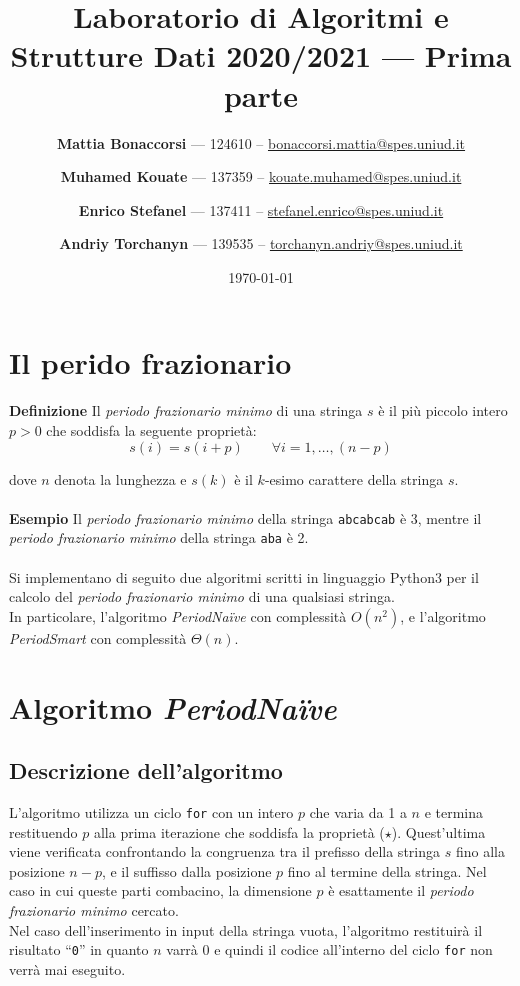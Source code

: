 \documentclass[11pt,a4paper,italian]{article}
\title{\textbf{Laboratorio di Algoritmi e Strutture Dati 2020/2021} --- Prima parte}
\date{\today}
\author{\textbf{Mattia Bonaccorsi} --- 124610 -- \href{mailto:bonaccorsi.mattia@spes.uniud.it}{bonaccorsi.mattia@spes.uniud.it}
   \and \textbf{Muhamed Kouate} --- 137359 -- \href{mailto:kouate.muhamed@spes.uniud.it}{kouate.muhamed@spes.uniud.it}
   \and \textbf{Enrico Stefanel} --- 137411 -- \href{mailto:stefanel.enrico@spes.uniud.it}{stefanel.enrico@spes.uniud.it}
   \and \textbf{Andriy Torchanyn} --- 139535 -- \href{mailto:torchanyn.andriy@spes.uniud.it}{torchanyn.andriy@spes.uniud.it}
   }
\begin{document}
\maketitle

\section{Il perido frazionario}
\textbf{Definizione} Il \textit{periodo frazionario minimo} di una stringa $s$ è il più piccolo intero $p>0$ che soddisfa la seguente
proprietà:
\begin{equation}
s(i) = s(i+p)\qquad \forall i = 1, \dots , (n-p) \tag{$\star$}
\end{equation}

dove $n$ denota la lunghezza e $s(k)$ è il $k$-esimo carattere della stringa $s$.\\
\\
\textbf{Esempio} Il \emph{periodo frazionario minimo} della stringa \texttt{abcabcab} è 3, mentre il \emph{periodo frazionario minimo} della stringa \texttt{aba} è 2.\\
\\
Si implementano di seguito due algoritmi scritti in linguaggio Python3 per il calcolo del \emph{periodo frazionario minimo} di una qualsiasi stringa.\\
In particolare, l'algoritmo \textit{PeriodNa{\"i}ve} con complessità $O(n^2)$, e l'algoritmo \textit{PeriodSmart} con complessità $\Theta(n)$.



\section{Algoritmo \textit{PeriodNa{\"i}ve}}

\subsection{Descrizione dell'algoritmo}
L'algoritmo utilizza un ciclo \texttt{for}  con un intero $p$ che varia da 1 a $n$ e termina restituendo $p$ alla prima iterazione che soddisfa la proprietà ($\star$). Quest'ultima viene verificata confrontando la congruenza tra il prefisso della stringa $s$ fino alla posizione $n-p$, e il suffisso dalla posizione $p$ fino al termine della stringa. Nel caso in cui queste parti combacino, la dimensione $p$ è esattamente il \textit{periodo frazionario minimo} cercato.\\
Nel caso dell'inserimento in input della stringa vuota, l'algoritmo restituirà il risultato ``\texttt{0}'' in quanto $n$ varrà 0 e quindi il codice all'interno del ciclo \texttt{for} non verrà mai eseguito.
\end{document}
